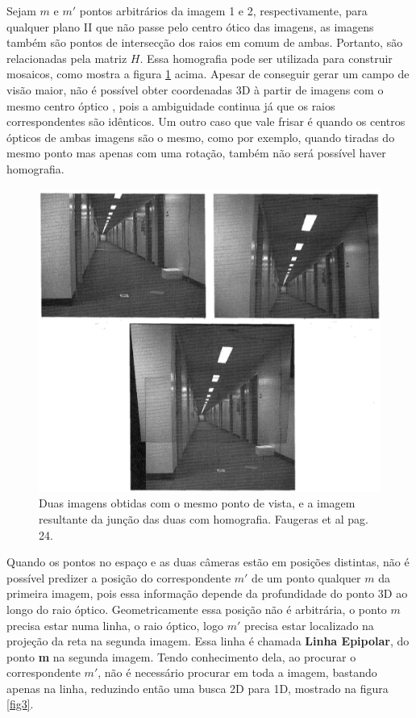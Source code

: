  Sejam $m$ e $m'$ pontos arbitrários da imagem 1 e 2, respectivamente, para qualquer plano II que não passe pelo centro ótico das imagens, as imagens também são pontos de intersecção dos raios em comum de ambas. Portanto, são relacionadas pela matriz $H$. Essa homografia pode ser utilizada para construir mosaicos, como mostra a figura \ref{fig2} acima. Apesar de conseguir gerar um campo de visão maior, não é possível obter coordenadas 3D à partir de imagens com o mesmo centro óptico \cite{Faugeras-Geometry}, pois a ambiguidade continua já que os raios correspondentes são idênticos. Um outro caso que vale frisar é quando os centros ópticos de ambas imagens são o mesmo, como por exemplo, quando tiradas do mesmo ponto mas apenas com uma rotação, também não será possível haver homografia.

\begin{figure}[H]
	\centering
		\includegraphics[width=1.0\textwidth]{Imagens/figura2-2.png}
	\caption{Duas imagens obtidas com o mesmo ponto de vista, e a imagem resultante da junção das duas com homografia. Faugeras et al \cite{Faugeras-Geometry} pag. 24.}
	\label{fig2}
\end{figure}

Quando os pontos no espaço e as duas câmeras estão em posições distintas, não é possível predizer a posição do correspondente $m'$ de um ponto qualquer $m$ da primeira imagem, pois essa informação depende da profundidade do ponto 3D ao longo do raio óptico. Geometricamente essa posição não é arbitrária, o ponto $m$ precisa estar numa linha, o raio óptico, logo $m'$ precisa estar localizado na projeção da reta na segunda imagem. Essa linha é chamada \textbf{Linha Epipolar}, do ponto \textbf{m} na segunda imagem. Tendo conhecimento dela, ao procurar o correspondente $m'$, não é necessário procurar em toda a imagem, bastando apenas na linha, reduzindo então uma busca 2D para 1D, mostrado na figura \ref{fig3}.

